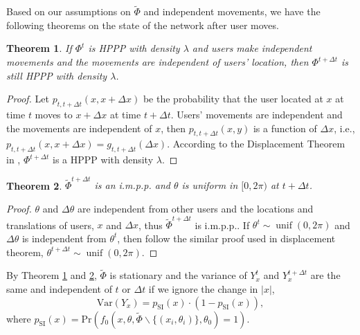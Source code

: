 \documentclass[10pt, conference, letterpaper]{IEEEtran}
\newtheorem{theorem}{Theorem}
\DeclareMathOperator*{\unif}{unif}
\begin{document}


Based on our assumptions on $\tilde{\Phi}$ and independent movements, we have the following theorems on the state of the network after user moves.

\begin{theorem}\label{theorem:hppp}
If $\Phi^t$ is HPPP with density $\lambda$ and users make independent movements and the movements are independent of users' location, then $\Phi^{t+\Delta t}$ is still HPPP with density $\lambda$. 
\end{theorem} 
\begin{proof}
Let $p_{t, t+\Delta t}(x, x+\Delta x)$ be the probability that the user located at $x$ at time $t$ moves to $x + \Delta x$ at time $t+\Delta t$. Users' movements are independent and the movements are independent of $x$, then $p_{t, t+\Delta t}(x, y)$ is a function of $\Delta x$, i.e., $p_{t, t+\Delta t}(x, x+\Delta x) = g_{t, t+\Delta t}(\Delta x)$.
According to the Displacement Theorem in \cite{poisson}, $\Phi^{t+\Delta t}$ is a HPPP with density $\lambda$.
\end{proof}

\begin{theorem}\label{theorem:hppp_orientation}
$\tilde{\Phi}^{t+\Delta t}$ is an i.m.p.p. and $\theta$ is uniform in $[0, 2\pi)$ at $t+ \Delta t$. 
\end{theorem}
\begin{proof}
	$\theta$ and $\Delta \theta$ are independent from other users and the locations and translations of users, $x$ and $\Delta x$, thus $\tilde{\Phi}^{t+\Delta t}$ is i.m.p.p.. If $\theta^t\sim \unif(0, 2\pi)$ and $\Delta \theta$ is independent from $\theta^t$, then follow the similar proof used in displacement theorem, $\theta^{t + \Delta t}\sim \unif(0, 2\pi)$. 
\end{proof}

By Theorem \ref{theorem:hppp} and \ref{theorem:hppp_orientation}, $\tilde{\Phi}$ is stationary and the variance of $Y_x^t$ and $Y_x^{t+\Delta t}$ are the same and independent of $t$ or $\Delta t$ if we ignore the change in $|x|$,  
\begin{equation*}
\mathrm{Var}(Y_x)=p_{\mathrm{SI}}(x)\cdot (1-p_{\mathrm{SI}}(x)),
\end{equation*}
where $p_{\mathrm{SI}}(x)=\mathrm{Pr}(f_0(x,\theta,\tilde{\Phi}\backslash\{(x_i,\theta_i)\}, \theta_0)=1)$. 
\end{document}
